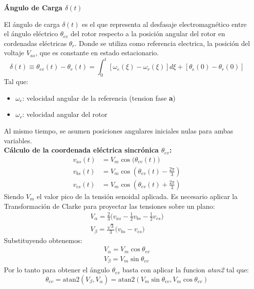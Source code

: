 \documentclass[12pt, a4paper,journal, onecolumn, compsoc]{IEEEtran}
\begin{document}
\textbf{Ángulo de Carga $\delta(t)$}

El ángulo de carga $\delta(t)$ es el que representa al desfasaje electromagnético entre el ángulo eléctrico $\theta_{ev}$ del rotor respecto a la posición angular del rotor en cordenadas eléctricas $\theta_r$. Donde se utiliza como referencia electrica, la posición del voltaje $V_{as}$, que es constante en estado estacionario.
\begin{equation}\label{eq:angulo_carga}
    \delta(t) \equiv \theta_{ev}(t)-\theta_r(t) = \int_0^t[\omega_e(\xi)-\omega_r(\xi)]d\xi +[\theta_e(0)-\theta_r(0)]
\end{equation}
Tal que:
\begin{itemize}
    \item $\omega_e$: velocidad angular de la referencia (tension fase \textbf{a})
    \item $\omega_r$: velocidad angular del rotor
\end{itemize}
Al mismo tiempo, se asumen posiciones angulares iniciales nulas para ambas variables.\\
\textbf{Cálculo de la coordenada eléctrica sincrónica $\theta_{ev}$:}
\begin{align*}
v_{as}(t) &= V_m \cos\big(\theta_{ev}(t)\big) \\
v_{bs}(t) &= V_m \cos\left(\theta_{ev}(t) - \frac{2\pi}{3}\right) \\
v_{cs}(t) &= V_m \cos\left(\theta_{ev}(t) + \frac{2\pi}{3}\right)
\end{align*}
Siendo $V_m$ el valor pico de la tensión senoidal aplicada.
Es necesario aplicar la Transformación de Clarke para proyectar las tensiones sobre un plano:
\begin{align*}
    V_{\alpha} = \frac{2}{3}\Big(v_{as} - \frac{1}{2}v_{bs}-\frac{1}{2}v_{cs}\Big) \\
    V_{\beta} = \frac{\sqrt{3}}{3}\big(v_{bs}-v_{cs}\big)
\end{align*}
Substituyendo obtenemos:
\begin{align}
    V_{\alpha} = V_m \cos{\theta_{ev}} \\
    V_{\beta} = V_m \sin{\theta_{ev}}
\end{align}
Por lo tanto para obtener el ángulo $\theta_{ev}$ basta con aplicar la funcion \textit{atan2} tal que:
\begin{equation}
    \theta_{ev} = \text{atan2}(V_{\beta},V_{\alpha})= \text{atan2}(V_m \sin{\theta_{ev}}, V_m \cos{\theta_{ev}})
\end{equation}
\end{document}

